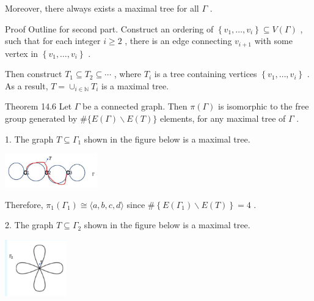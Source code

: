 Moreover, there always exists a maximal tree for all \(\Gamma\) .

Proof Outline for second part. Construct an ordering of \(\left\{  {{v}_{1},\ldots ,{v}_{i}}\right\}   \subseteq  V\left( \Gamma \right)\) , such that for each integer \(i \geq  2\) , there is an edge connecting \({v}_{i + 1}\) with some vertex in \(\left\{  {{v}_{1},\ldots ,{v}_{i}}\right\}\) .

Then construct \({T}_{1} \subseteq  {T}_{2} \subseteq  \cdots\) , where \({T}_{i}\) is a tree containing vertices \(\left\{  {{v}_{1},\ldots ,{v}_{i}}\right\}\) . As a result, \(T = { \cup  }_{i \in  \mathbb{N}}{T}_{i}\) is a maximal tree.

Theorem 14.6 Let \(\Gamma\) be a connected graph. Then \(\pi \left( \Gamma \right)\) is isomorphic to the free group generated by \(\# \{ E\left( \Gamma \right)  \smallsetminus  E\left( T\right) \}\) elements, for any maximal tree of \(\Gamma\) .

1. The graph \(T \subseteq  {\Gamma }_{1}\) shown in the figure below is a maximal tree.

\begin{center}
\includegraphics[max width=0.3\textwidth]{images/bo_d2bcsrref24c73avs720_146_760_1090_465_169_0.jpg}
\end{center}
\hspace*{3em} 

Therefore, \({\pi }_{1}\left( {\Gamma }_{1}\right)  \cong  \langle a,b,c,d\rangle\) since \(\# \left\{  {E\left( {\Gamma }_{1}\right)  \smallsetminus  E\left( T\right) }\right\}   = 4\) .

2. The graph \(T \subseteq  {\Gamma }_{2}\) shown in the figure below is a maximal tree.

\begin{center}
\includegraphics[max width=0.2\textwidth]{images/bo_d2bcsrref24c73avs720_146_832_1473_281_258_0.jpg}
\end{center}
\hspace*{3em} 

